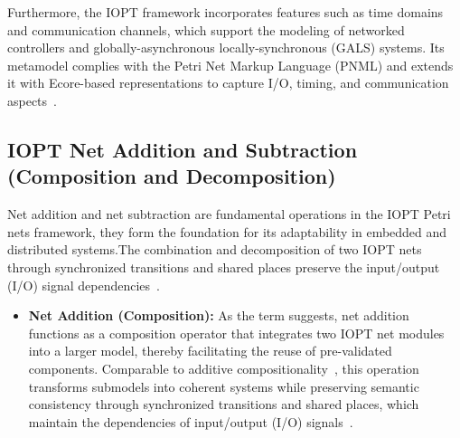 Furthermore, the IOPT framework incorporates features such as time domains and communication channels, which support the modeling of networked controllers and globally-asynchronous locally-synchronous (GALS) systems. Its metamodel complies with the Petri Net Markup Language (PNML) and extends it with Ecore-based representations to capture I/O, timing, and communication aspects~\cite{iopttools}.




\subsection{IOPT Net Addition and Subtraction (Composition and Decomposition)}
\label{sub:net_addicion}

Net addition and net subtraction are fundamental operations in the IOPT Petri nets framework, they form the foundation for its adaptability in embedded and distributed systems.The combination and decomposition of two IOPT nets through synchronized transitions and shared places preserve the input/output (I/O) signal dependencies~\cite{add1}.

\begin{itemize}
    \item \textbf{Net Addition (Composition): }     
As the term suggests, net addition functions as a composition operator that integrates two IOPT net modules into a larger model, thereby facilitating the reuse of pre-validated components. Comparable to additive compositionality~\cite{add2}, this operation transforms submodels into coherent systems while preserving semantic consistency through synchronized transitions and shared places, which maintain the dependencies of input/output (I/O) signals~\cite{add1}.
\end{itemize}

